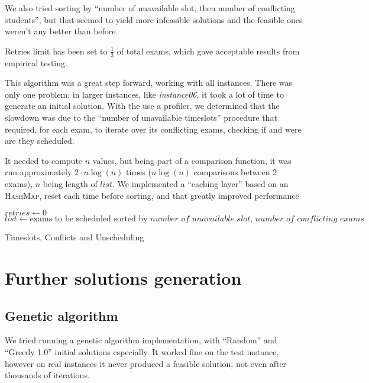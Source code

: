 \documentclass[11pt, a4paper, leqno]{article}
\begin{document}
	We also tried sorting by ``number of unavailable slot, then number of conflicting students'', but that seemed to yield more infeasible solutions and the feasible ones weren't any better than before.
	
	Retries limit has been set to $\frac{1}{3}$ of total exams, which gave acceptable results from empirical testing.
	
	This algorithm was a great step forward, working with all instances. There was only one problem: in larger instances, like \textit{instance06}, it took a lot of time to generate an initial solution. With the use a profiler, we determined that the slowdown was due to the ``number of unavailable timeslots'' procedure that required, for each exam, to iterate over its conflicting exams, checking if and were are they scheduled.
	
	It needed to compute $n$ values, but being part of a comparison function, it was run approximately $2\cdot n \log(n)$ times ($n \log(n)$ comparisons between 2 exams), $n$ being length of $list$. We implemented a ``caching layer'' based on an \textsc{HashMap}, reset each time before sorting, and that greatly improved performance
	
	\begin{algorithm}[H]
		$retries \gets 0$\;
		$list \gets \text{exams to be scheduled sorted by }\textit{number of unavailable slot, number of conflicting exams}$\;
		\;
		\caption{Timeslots, Conflicts and Unscheduling}
	\end{algorithm}
	
	\section{Further solutions generation}
	
	\subsection{Genetic algorithm}
	We tried running a genetic algorithm implementation, with ``Random'' and ``Greedy 1.0'' initial solutions especially. It worked fine on the test instance, however on real instances it never produced a feasible solution, not even after thousands of iterations.
	
\end{document}
